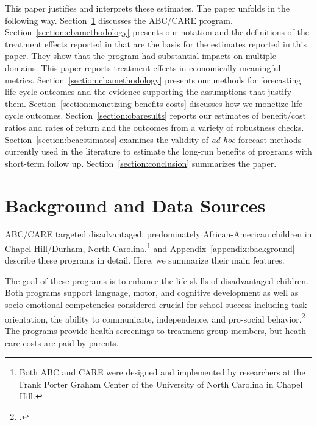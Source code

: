 This paper justifies and interprets these estimates. The paper unfolds in the following way. Section~\ref{section:background} discusses the ABC/CARE program. Section~\ref{section:cbamethodology} presents our notation and the definitions of the treatment effects reported in \cite{Garcia_Heckman_Ziff_2017_Gender-Diff_UNPUBLISHED} that are the basis for the estimates reported in this paper. They show that the program had substantial impacts on multiple domains. This paper reports treatment effects in economically meaningful metrics.  Section~\ref{section:cbamethodology} presents our methods for forecasting life-cycle outcomes and the evidence supporting the assumptions that justify them. Section~\ref{section:monetizing-benefits-costs} discusses how we monetize life-cycle outcomes. Section~\ref{section:cbaresults} reports our estimates of benefit/cost ratios and rates of return and the outcomes from a variety of robustness checks. Section~\ref{section:bcaestimates} examines the validity of \emph{ad hoc} forecast methods currently used in the literature to estimate the long-run benefits of programs with short-term follow up. Section~\ref{section:conclusion} summarizes the paper.

\section[Background and Data Sources]{Background and Data Sources} \label{section:background}

ABC/CARE targeted disadvantaged, predominately African-American children in Chapel Hill/Durham, North Carolina.\footnote{Both ABC and CARE were designed and implemented by researchers at the Frank Porter Graham Center of the University of North Carolina in Chapel Hill.} \cite{Garcia_Heckman_Ziff_2017_Gender-Diff_UNPUBLISHED} and  Appendix~\ref{appendix:background} describe these programs in detail. Here, we summarize their main features.

The goal of these programs is to enhance the life skills of disadvantaged children. Both programs support language, motor, and cognitive development as well as socio-emotional competencies considered crucial for school success including task orientation, the ability to communicate, independence, and pro-social behavior.\footnote{\citet{Sparling_1974_Synth_Edu_Infant_SPEECH, Ramey_Collier_etal_1976_CarolinaAbecedarianProject, Ramey_etal_1985_Project-CARE_TiECSE, Wasik_Ramey_etal_1990_CD, Ramey-etal_2012-ABC}.} The programs provide health screenings to treatment group members, but heath care costs are paid by parents.

